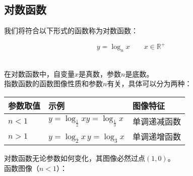 \documentclass[UTF8]{ctexart}
\begin{document}
\subsection{对数函数}
    我们将符合以下形式的函数称为对数函数：
    \begin{large}
        \begin{equation*}
            y=\log_{n}{x}\qquad x\in\mathbb{R^+}
        \end{equation*}
    \end{large}\\
    在对数函数中，自变量$x$是真数，参数$n$是底数。\\[3mm]
    指数函数的函数图像性质和参数$n$有关，具体可以分为两种：\vspace{5pt}
    \begin{center}
        \begin{tabular}{l|l|l}
            \hline
            参数取值&示例&图像特征\\ \hline
            $n<1$\qquad\qquad&$y=\log_{\frac{1}{2}}x$\qquad$y=\log_{\frac{1}{3}}x$&单调递减函数\qquad\qquad\\ \hline
            $n>1$\qquad\qquad&$y=\log_{2}x$\qquad\,$y=\log_{3}x$\qquad\qquad&单调递增函数\\ \hline
        \end{tabular}
    \end{center}
    \vspace{10pt}
    对数函数无论参数如何变化，其图像必然过点$(1,0)$。\\[3mm]
    函数图像（$n<1$）：
\end{document}
